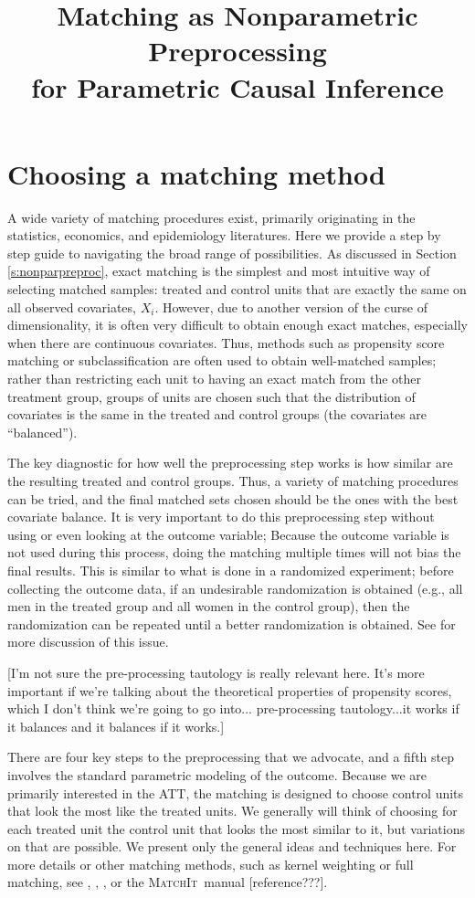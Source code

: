 \documentclass[11pt,titlepage]{article}
\title{Matching as Nonparametric Preprocessing\\
for Parametric Causal Inference}
\newcommand{\MatchIt}{\textsc{MatchIt}}
\begin{document}
\baselineskip

\section{Choosing a matching method}
A wide variety of matching procedures exist, primarily originating in the statistics, economics, and epidemiology literatures.  Here we provide
a step by step guide to navigating the broad range of possibilities. 
As discussed in Section \ref{s:nonparpreproc}, exact matching is the simplest and most intuitive way of selecting matched samples: treated and control units
that are exactly the same on all observed covariates, $X_i$.  However, due to another version of the curse of dimensionality, it is often very difficult to
obtain enough exact matches, especially when there are continuous covariates.   Thus, methods such as propensity score matching or subclassification are often used
to obtain well-matched samples; rather than restricting each unit to having an exact match from the other treatment group, groups of units are chosen such
that the distribution of covariates is the same in the treated and control groups (the covariates are ``balanced'').

The key diagnostic for how well the preprocessing step works is how similar are the resulting treated and control groups.  Thus, a variety of matching
procedures can be tried, and the final matched sets chosen should be the ones with the best covariate balance.  It is very important to do
this preprocessing step without using or even looking at the outcome variable; Because the outcome variable
is not used during this process, doing the matching multiple times will not bias the final results.   This is similar to what is done in a randomized experiment; before
collecting the outcome data, if an undesirable randomization is obtained (e.g., all men in the treated group and all women in the control group), then the randomization
can be repeated until a better randomization is obtained.  See \cite{Rubin01} for more discussion of this issue.

[I'm not sure the pre-processing tautology is really relevant here.  It's more important if we're talking about the theoretical properties of propensity
scores, which I don't think we're going to go into...   pre-processing tautology...it works if it balances and it balances if it works.]

There are four key steps to the preprocessing that we advocate, and a fifth step involves the standard parametric modeling of the outcome.
Because we are primarily interested in the ATT, the matching is designed to choose control units that look the most like the treated units.  We generally will think of
choosing for each treated unit the control unit that looks the most similar to it, but variations on that are possible.   
We present only the general ideas and techniques here. For more details 
or other matching methods, such as kernel weighting or full matching, see \cite{Imbens04}, \cite{Stuart04}, \cite{Rosenbaum02}, or the \MatchIt\ manual [reference???]. 
\end{document}
